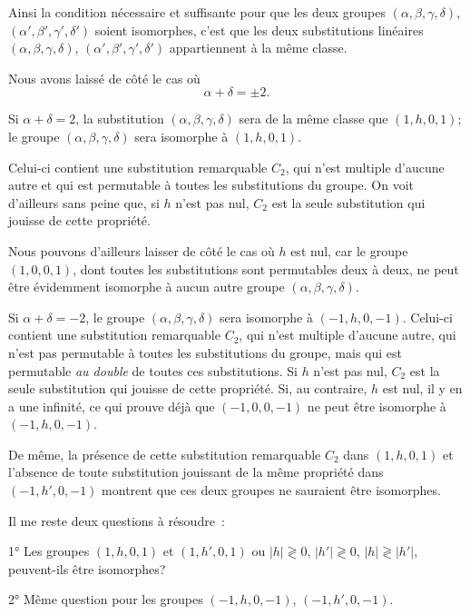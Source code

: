\documentclass{article}
\begin{document}
Ainsi la condition nécessaire et suffisante pour que les deux groupes $(\alpha, \beta, \gamma, \delta)$, $(\alpha', \beta', \gamma', \delta')$ soient isomorphes, c'est que les deux substitutions linéaires $(\alpha, \beta, \gamma, \delta)$, $(\alpha', \beta', \gamma', \delta')$ appartiennent à la même classe.

Nous avons laissé de côté le cas où
\[ \alpha + \delta = \pm 2. \]

Si $\alpha + \delta = 2$, la substitution $(\alpha, \beta, \gamma, \delta)$ sera de la même classe que $(1, h, 0, 1)$; le groupe $(\alpha, \beta, \gamma, \delta)$ sera isomorphe à $(1, h, 0, 1)$.

Celui-ci contient une substitution remarquable $C_{2}$, qui n'est multiple d'aucune autre et qui est permutable à toutes les substitutions du groupe. On voit d'ailleurs sans peine que, si $h$ n'est pas nul, $C_{2}$ est la seule substitution qui jouisse de cette propriété.

Nous pouvons d'ailleurs laisser de côté le cas où $h$ est nul, car le groupe $(1, 0, 0, 1)$, dont toutes les substitutions sont permutables deux à deux, ne peut être évidemment isomorphe à aucun autre groupe $(\alpha, \beta, \gamma, \delta)$.

Si $\alpha + \delta = -2$, le groupe $(\alpha, \beta, \gamma, \delta)$ sera isomorphe à $(-1, h, 0, -1)$. Celui-ci contient une substitution remarquable $C_{2}$, qui n'est multiple d'aucune autre, qui n'est pas permutable à toutes les substitutions du groupe, mais qui est permutable \emph{au double} de toutes ces substitutions. Si $h$ n'est pas nul, $C_{2}$ est la seule substitution qui jouisse de cette propriété. Si, au contraire, $h$ est nul, il y en a une infinité, ce qui prouve déjà que $(-1, 0, 0, -1)$ ne peut être isomorphe à $(-1, h, 0, -1)$.

De même, la présence de cette substitution remarquable $C_{2}$ dans $(1, h, 0, 1)$ et l'absence de toute substitution jouissant de la même propriété dans $(-1, h', 0, -1)$ montrent que ces deux groupes ne sauraient être isomorphes.

Il me reste deux questions à résoudre~:

1° Les groupes $(1, h, 0, 1)$ et $(1, h', 0, 1)$ ou $|h| \gtrless 0$, $|h'| \gtrless 0$, $|h| \gtrless |h'|$, peuvent-ils être isomorphes?

2° Même question pour les groupes $(-1, h, 0, -1)$, $(-1, h', 0, -1)$.
\end{document}
